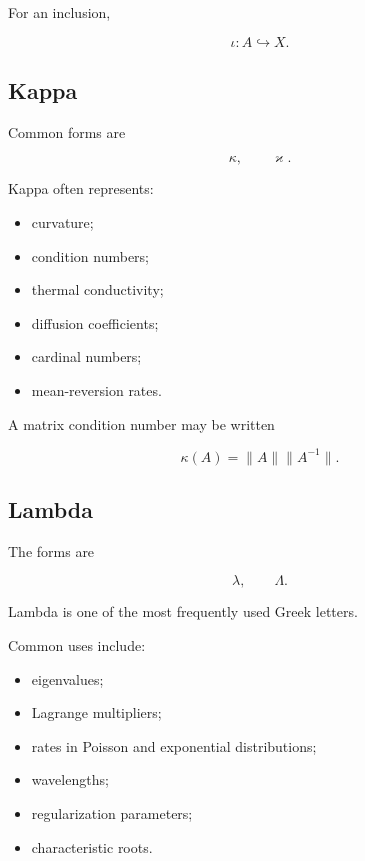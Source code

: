 For an inclusion,

\[
\boxed{
\iota:A\hookrightarrow X.
}
\]

\subsection{Kappa}
\label{subsec:greek-kappa}

Common forms are

\[
\boxed{
\kappa,
\qquad
\varkappa.
}
\]

Kappa often represents:

\begin{itemize}
    \item curvature;
    \item condition numbers;
    \item thermal conductivity;
    \item diffusion coefficients;
    \item cardinal numbers;
    \item mean-reversion rates.
\end{itemize}

A matrix condition number may be written

\[
\boxed{
\kappa(A)
=
\|A\|
\|A^{-1}\|.
}
\]

\subsection{Lambda}
\label{subsec:greek-lambda}

The forms are

\[
\boxed{
\lambda,
\qquad
\Lambda.
}
\]

Lambda is one of the most frequently used Greek letters.

Common uses include:

\begin{itemize}
    \item eigenvalues;
    \item Lagrange multipliers;
    \item rates in Poisson and exponential distributions;
    \item wavelengths;
    \item regularization parameters;
    \item characteristic roots.
\end{itemize}

